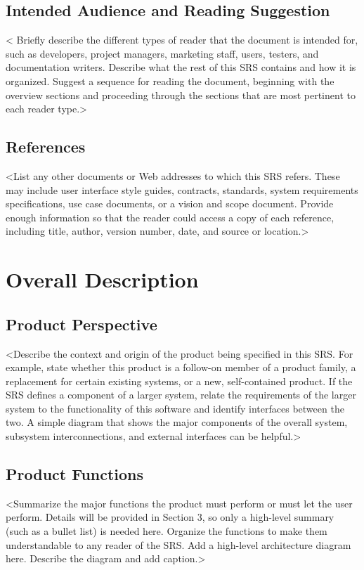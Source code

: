 \documentclass{article}
\begin{document}
\subsection{Intended Audience and Reading Suggestion}

< Briefly describe the different types of reader that the document is intended for, such as developers, project managers, marketing staff, users, testers, and documentation writers. Describe what the rest of this SRS contains and how it is organized. Suggest a sequence for reading the document, beginning with the overview sections and proceeding through the sections that are most pertinent to each reader type.>

\subsection{References}
<List any other documents or Web addresses to which this SRS refers. These may include user interface style guides, contracts, standards, system requirements specifications, use case documents, or a vision and scope document. Provide enough information so that the reader could access a copy of each reference, including title, author, version number, date, and source or location.>
\section{Overall Description}

\subsection{Product Perspective}
<Describe the context and origin of the product being specified in this SRS. For example, state whether this product is a follow-on member of a product family, a replacement for certain existing systems, or a new, self-contained product. If the SRS defines a component of a larger system, relate the requirements of the larger system to the functionality of this software and identify interfaces between the two. A simple diagram that shows the major components of the overall system, subsystem interconnections, and external interfaces can be helpful.>

\subsection{Product Functions}
<Summarize the major functions the product must perform or must let the user perform. Details will be provided in Section 3, so only a high-level summary (such as a bullet list) is needed here. Organize the functions to make them understandable to any reader of the SRS. Add a high-level architecture diagram here. Describe the diagram and add caption.>
\end{document}
